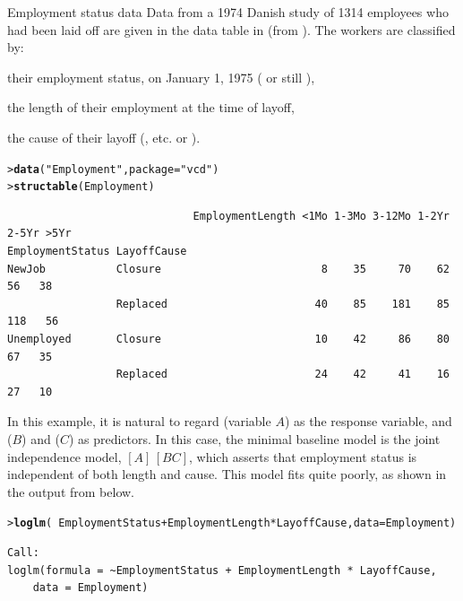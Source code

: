 \documentclass[10pt,krantz2]{krantz}\usepackage[]{graphicx}\usepackage[]{color}
\makeatletter
\newcommand{\hlstr}[1]{\textcolor[rgb]{0.192,0.494,0.8}{#1}}%
\newcommand{\hlopt}[1]{\textcolor[rgb]{0,0,0}{#1}}%
\newcommand{\hlstd}[1]{\textcolor[rgb]{0.345,0.345,0.345}{#1}}%
\newcommand{\hlkwc}[1]{\textcolor[rgb]{0.333,0.667,0.333}{#1}}%
\newcommand{\hlkwd}[1]{\textcolor[rgb]{0.737,0.353,0.396}{\textbf{#1}}}%
\newenvironment{kframe}{%
 \def\at@end@of@kframe{}%
 \ifinner\ifhmode%
  \def\at@end@of@kframe{\end{minipage}}%
  \begin{minipage}{\columnwidth}%
 \fi\fi%
 \def\FrameCommand##1{\hskip\@totalleftmargin \hskip-\fboxsep
 \colorbox{shadecolor}{##1}\hskip-\fboxsep
     \hskip-\linewidth \hskip-\@totalleftmargin \hskip\columnwidth}%
 \MakeFramed {\advance\hsize-\width
   \@totalleftmargin\z@ \linewidth\hsize
   \@setminipage}}%
 {\par\unskip\endMakeFramed%
 \at@end@of@kframe}
\newenvironment{knitrout}{}{} %
\renewenvironment{knitrout}{\small\renewcommand{\baselinestretch}{.85}}{} %
\makeatother
\begin{document}
\begin{Example}[employ]{Employment status data}
Data from a 1974 Danish study of 1314 employees who had been laid off
are given in the data table  in 
(from \citet[Table 5.12]{Andersen:91}).
The workers are classified by:
\begin{seriate}
\item their employment status, on January 1, 1975 ( or still ),
\item the length of their employment at the time of layoff,
\item the cause of their layoff (, etc. or ).
\end{seriate}

\begin{knitrout}\footnotesize
{}\color{fgcolor}\begin{kframe}
\begin{alltt}
\hlstd{> }\hlkwd{data}\hlstd{(}\hlstr{"Employment"}\hlstd{,} \hlkwc{package} \hlstd{=} \hlstr{"vcd"}\hlstd{)}
\hlstd{> }\hlkwd{structable}\hlstd{(Employment)}
\end{alltt}
\begin{verbatim}
                             EmploymentLength <1Mo 1-3Mo 3-12Mo 1-2Yr 2-5Yr >5Yr
EmploymentStatus LayoffCause                                                    
NewJob           Closure                         8    35     70    62    56   38
                 Replaced                       40    85    181    85   118   56
Unemployed       Closure                        10    42     86    80    67   35
                 Replaced                       24    42     41    16    27   10
\end{verbatim}
\end{kframe}
\end{knitrout}

In this example, it is natural to regard  (variable $A$)
as the response variable,
and  ($B$) and  ($C$) as predictors.
In this case, the minimal baseline model is the joint independence model,
\([A] \,  [BC] \), which asserts that  employment status is independent of both
length and cause.
This model fits quite poorly, as shown in the output from  below.
\begin{knitrout}
\color{fgcolor}\begin{kframe}
\begin{alltt}
\hlstd{> }\hlkwd{loglm}\hlstd{(}\hlopt{~} \hlstd{EmploymentStatus} \hlopt{+} \hlstd{EmploymentLength} \hlopt{*} \hlstd{LayoffCause,} \hlkwc{data} \hlstd{= Employment)}
\end{alltt}
\begin{verbatim}
Call:
loglm(formula = ~EmploymentStatus + EmploymentLength * LayoffCause, 
    data = Employment)


\end{verbatim}
\end{kframe}
\end{knitrout}
\end{Example}
\end{document}
